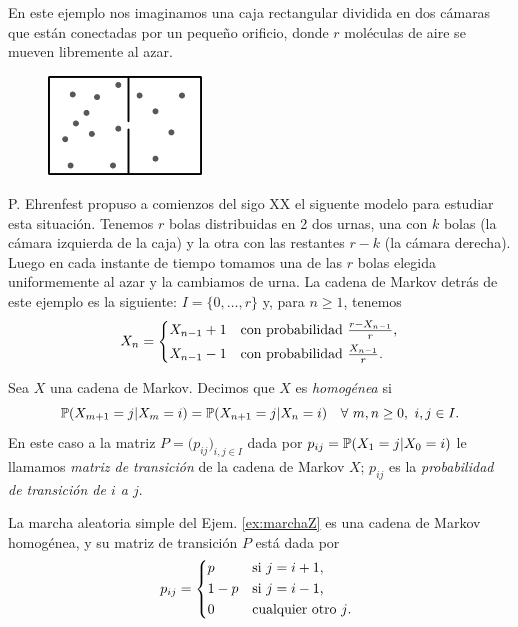 \begin{ex}\label{ex:ehrenfest}
En este ejemplo nos imaginamos una caja rectangular dividida en dos cámaras que están conectadas por un pequeño orificio, donde $r$ moléculas de aire se mueven libremente al azar.
\begin{figure}[h]
\centering
\includegraphics[width=1.6in]{figures/ehrenfest.png}
\end{figure}
P. Ehrenfest propuso a comienzos del sigo XX el siguente modelo para estudiar esta situación.
Tenemos $r$ bolas distribuidas en 2 dos urnas, una con $k$ bolas (la cámara izquierda de la caja) y la otra con las restantes $r-k$ (la cámara derecha).
Luego en cada instante de tiempo tomamos una de las $r$ bolas elegida uniformemente al azar y la cambiamos de urna.
La cadena de Markov detrás de este ejemplo es la siguiente: $I=\{0,\dots,r\}$ y, para $n\geq1$, tenemos
\[X_n=\begin{dcases*}
X_{n-1}+1 & con probabilidad $\frac{r-X_{n-1}}{r}$,\\
X_{n-1}-1 & con probabilidad $\frac{X_{n-1}}{r}$.
\end{dcases*}\]
\end{ex}


\begin{defn}
Sea $X$ una cadena de Markov.
Decimos que $X$ es \emph{homogénea} si
\[\mathbb{P}(X_{m+1}=j|X_m=i)=\mathbb{P}(X_{n+1}=j|X_n=i)\quad\forall~m,n\geq0,~i,j\in I.\]
En este caso a la matriz $P=\big(p_{ij}\big)_{i,j\in I}$ dada por $p_{ij}=\mathbb{P}(X_{1}=j|X_0=i)$ le llamamos \emph{matriz de transición} de la cadena de Markov $X$; $p_{ij}$ es la \emph{probabilidad de transición de $i$ a $j$}.
\end{defn}

\begin{ex}
La marcha aleatoria simple del Ejem. \ref{ex:marchaZ} es una cadena de Markov homogénea, y su matriz de transición $P$ está dada por
\[p_{ij}=\begin{dcases*}
p & si $j=i+1$,\\
1-p & si $j=i-1$,\\
0 & cualquier otro $j$.
\end{dcases*}\]
\end{ex}

